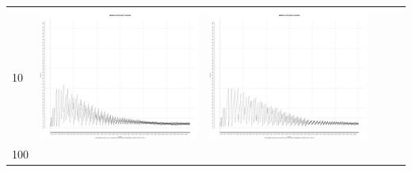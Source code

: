 \begin{table}[htbp]
{\begin{tabular}{l | ccccc}
\begin{minipage}{.15\textwidth}
    				 \end{minipage}\\			
		10	   & \begin{minipage}{.15\textwidth}
     			 	\includegraphics[width=\linewidth]{images/mema-graph/I2}
    				\end{minipage}
    			   & \begin{minipage}{.15\textwidth}
     			 	\includegraphics[width=\linewidth]{images/mema-graph/I6}
    				 \end{minipage}\\		
		100	   & \begin{minipage}{.15\textwidth}

\end{minipage}
\end{tabular}}
\end{table}
